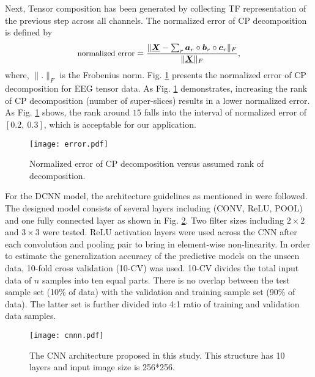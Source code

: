 \documentclass{article}
\begin{document}
\indent
Next, Tensor composition has been generated by collecting TF representation of the previous step across all channels. The normalized error of CP decomposition is defined by
\begin{equation}
    {\small \text{normalized error}}=\frac{\|\underline{\boldsymbol{X}}-\sum_r \boldsymbol{a}_r\circ \boldsymbol{b}_r \circ \boldsymbol{c}_r\|_F}{\|\underline{\boldsymbol{X}}\|_F},
    \label{eggg}
\end{equation}
where, $\|.\|_F$ is the Frobenius norm. Fig. \ref{fig:tensor_rank} presents the normalized error of CP decomposition for EEG tensor data. As Fig. \ref{fig:tensor_rank}  demonstrates, increasing the rank of CP decomposition (number of super-slices)  results in a lower normalized error. As Fig. \ref{fig:tensor_rank} shows, the rank around $15$ falls into the interval of normalized error of  $[0.2,\ 0.3]$, which is acceptable for our application.\\  
\begin{figure}[h]
\centerline{\texttt{[image: error.pdf]}}
\vspace{-4mm}
\caption{\small{Normalized error of CP decomposition versus assumed rank of decomposition.}}
\vspace{-3mm}
\label{fig:tensor_rank}
\end{figure}
\indent For the DCNN model, the architecture guidelines as mentioned in \cite{changal} were followed. The designed model consists of several layers including (CONV, ReLU, POOL)
and one fully connected layer as shown in Fig. \ref{CNN_arch}.
Two filter sizes including $2\times2$ and $3\times3$ were tested. 
ReLU activation layers were used across the CNN after each convolution and pooling pair to bring in element-wise non-linearity.
In order to estimate the generalization accuracy of the predictive models on the unseen data, 10-fold cross validation (10-CV) was used. 10-CV divides the total input data of $n$ samples into ten equal parts. 
There is no overlap between the test sample set (10\% of data) with the validation and training sample set (90\% of data). The latter set is further divided into 4:1 ratio of training and validation data samples. 
\begin{figure}[b]
\vspace{-3mm}
\centerline{\texttt{[image: cnnn.pdf]}}
\caption{\small{
The CNN architecture proposed in this study. This structure has 10 layers and input image size is 256*256.}} \label{CNN_arch}
\vspace{-3mm}
\end{figure}
\end{document}
